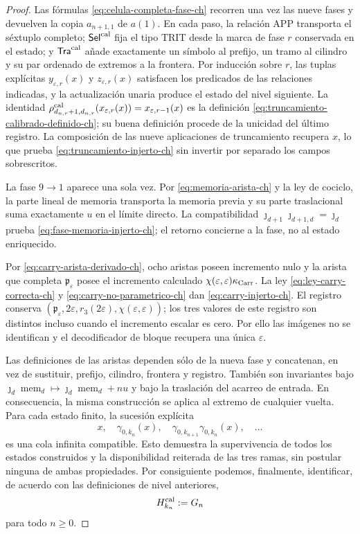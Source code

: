 \begin{proof}
Las fórmulas \eqref{eq:celula-completa-fase-ch} recorren una vez las nueve
fases y devuelven la copia \(a_{n+1,1}\) de \(a(1)\). En cada paso, la relación APP transporta el
séxtuplo completo; \(\mathsf{Sel}^{\rm cal}\) fija el tipo TRIT desde la marca de fase
\(r\) conservada en el estado;
y \(\mathsf{Tra}^{\rm cal}\) añade exactamente un símbolo al prefijo, un tramo al
cilindro y su par ordenado de extremos a la frontera. Por inducción sobre
\(r\), las tuplas explícitas \(y_{\varepsilon,r}(x)\) y
\(z_{\varepsilon,r}(x)\) satisfacen los predicados de las relaciones
indicadas, y la actualización unaria produce el estado del nivel siguiente.
La identidad
\(\rho^{\rm cal}_{d_{n,r}+1,d_{n,r}}
(x_{\varepsilon,r}(x))=x_{\varepsilon,r-1}(x)\) es la definición
\eqref{eq:truncamiento-calibrado-definido-ch}; su buena definición procede de
la unicidad del último registro. La composición de las nueve aplicaciones de
truncamiento recupera \(x\), lo que prueba
\eqref{eq:truncamiento-injerto-ch} sin invertir por separado los campos
sobrescritos.

La fase \(9\to1\) aparece una sola vez. Por
\eqref{eq:memoria-arista-ch} y la ley de cociclo, la parte lineal de memoria
transporta la memoria previa y su parte traslacional suma exactamente \(u\)
en el límite directo. La compatibilidad
\(\jmath_{d+1}\jmath_{d+1,d}=\jmath_d\) prueba
\eqref{eq:fase-memoria-injerto-ch}; el retorno concierne a la fase, no al
estado enriquecido.

Por \eqref{eq:carry-arista-derivado-ch}, ocho aristas poseen incremento nulo y
la arista que completa \(\mathfrak p_\varepsilon\) posee el incremento calculado
\(\chi(\varepsilon,\varepsilon)\kappa_{\rm Carr}\). La ley
\eqref{eq:ley-carry-correcta-ch} y
\eqref{eq:carry-no-parametrico-ch} dan
\eqref{eq:carry-injerto-ch}. El registro conserva
\((\mathfrak p_\varepsilon,2\varepsilon,r_3(2\varepsilon),
\chi(\varepsilon,\varepsilon))\); los tres valores de este registro son
distintos incluso cuando el incremento escalar es cero. Por ello las imágenes
no se identifican y el decodificador de bloque recupera una única
\(\varepsilon\).

Las definiciones de las aristas dependen sólo de la nueva fase y concatenan,
en vez de sustituir, prefijo, cilindro, frontera y registro. También son
invariantes bajo
\(\jmath_d\operatorname{mem}_d\mapsto
  \jmath_d\operatorname{mem}_d+nu\)
y bajo la traslación del acarreo de
entrada. En consecuencia, la misma construcción se aplica al extremo de
cualquier vuelta. Para cada estado finito, la sucesión explícita
\[
 x,\quad\gamma_{0,k_n}(x),\quad
 \gamma_{0,k_{n+1}}\gamma_{0,k_n}(x),\quad\ldots
\]
es una cola infinita compatible. Esto demuestra la supervivencia de todos los
estados construidos y la disponibilidad reiterada de las tres ramas, sin
postular ninguna de ambas propiedades. Por consiguiente podemos, finalmente,
identificar, de acuerdo con las definiciones de nivel anteriores,
\begin{equation}
 H_{k_n}^{\rm cal}:=G_n
 \label{eq:subarbol-calibrado-superviviente-ch}
\end{equation}
para todo \(n\ge0\).
\end{proof}

